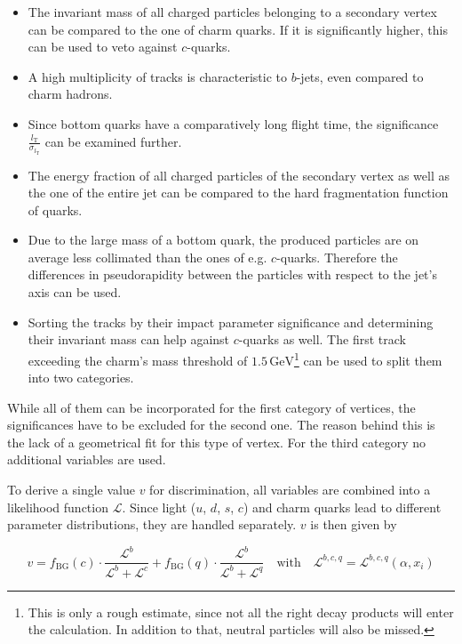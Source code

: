\begin{itemize}
\item The invariant mass of all charged particles belonging to a secondary vertex can be compared to the one of charm quarks. If it is significantly higher, this can be used to veto against $c$-quarks.
\item A high multiplicity of tracks is characteristic to $b$-jets, even compared to charm hadrons.
\item Since bottom quarks have a comparatively long flight time, the significance $\frac{l_{\text{T}}}{\sigma_{l_{\text{T}}}}$ can be examined further.
\item The energy fraction of all charged particles of the secondary vertex as well as the one of the entire jet can be compared to the hard fragmentation function of quarks.
\item Due to the large mass of a bottom quark, the produced particles are on average less collimated than the ones of e.g. $c$-quarks. Therefore the differences in pseudorapidity between the particles with respect to the jet's axis can be used.
\item Sorting the tracks by their impact parameter significance and determining their invariant mass can help against $c$-quarks as well. The first track exceeding the charm's mass threshold of $1.5\,\text{GeV}$\footnote{This is only a rough estimate, since not all the right decay products will enter the calculation. In addition to that, neutral particles will also be missed.} can be used to split them into two categories.
\end{itemize}

\noindent While all of them can be incorporated for the first category of vertices, the significances have to be excluded for the second one. The reason behind this is the lack of a geometrical fit for this type of vertex. For the third category no additional variables are used.

To derive a single value $v$ for discrimination, all variables are combined into a likelihood function $\mathcal{L}$. Since light ($u$, $d$, $s$, $c$) and charm quarks lead to different parameter distributions, they are handled separately. $v$ is then given by

\begin{equation}
  \label{eq:btagdiscriminator}
  v = f_{\text{BG}}(c) \cdot \frac{\mathcal{L}^b}{\mathcal{L}^b + \mathcal{L}^c} + f_{\text{BG}}(q) \cdot \frac{\mathcal{L}^b}{\mathcal{L}^b + \mathcal{L}^q} \quad \text{with} \quad \mathcal{L}^{b, c, q} = \mathcal{L}^{b, c, q} (\alpha, x_i)
\end{equation}

